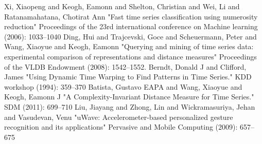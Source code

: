 \begin{thebibliography}{1}
     Xi, Xiaopeng and Keogh, Eamonn and Shelton, Christian and Wei, Li and Ratanamahatana, Chotirat
    Ann "Fast time series classification using numerosity reduction" Proceedings of the 23rd international conference on
    Machine learning (2006): 1033--1040
     Ding, Hui and Trajcevski, Goce and Scheuermann, Peter and Wang, Xiaoyue and Keogh, Eamonn
    "Querying and mining of time series data: experimental comparison of representations and distance measures"
    Proceedings of the VLDB Endowment (2008): 1542--1552.
     Berndt, Donald J and Clifford, James "Using Dynamic Time Warping to Find Patterns in
    Time Series." KDD workshop (1994): 359--370
     Batista, Gustavo EAPA and Wang, Xiaoyue and Keogh, Eamonn J "A
    Complexity-Invariant Distance Measure for Time Series." SDM (2011): 699--710
     Liu, Jiayang and Zhong, Lin and Wickramasuriya, Jehan and Vasudevan, Venu "uWave:
    Accelerometer-based personalized gesture recognition and its applications" Pervasive and Mobile Computing
    (2009): 657--675
\end{thebibliography}
